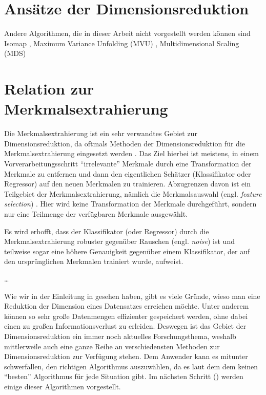 \section{Ansätze der Dimensionsreduktion}
\label{ch:Dimensionsreduktion:Ansaetze}

Andere Algorithmen, die in dieser Arbeit nicht vorgestellt werden können sind Isomap \parencite{Tenenbaum.2000}, Maximum Variance Unfolding (MVU) \parencite{Weinberger.2006}, Multidimensional Scaling (MDS) \parencites{Kruskal.1964}{Cox.2008}

\section{Relation zur Merkmalsextrahierung}
\label{ch:Dimensionsreduktion:Merkmalsextrahierung}

Die Merkmalsextrahierung ist ein sehr verwandtes Gebiet zur Dimensionsreduktion, da oftmals
Methoden der Dimensionsreduktion für die Merkmalsextrahierung eingesetzt werden \parencite[3]{Guyon.2006b}. Das Ziel hierbei ist meistens, in einem Vorverarbeitungsschritt
\enquote{irrelevante} Merkmale durch eine Transformation der Merkmale zu entfernen und dann den
eigentlichen Schätzer (Klassifikator oder Regressor) auf den neuen Merkmalen zu trainieren.
Abzugrenzen davon ist ein Teilgebiet der Merkmalsextrahierung, nämlich die Merkmalsauswahl (engl.
\textit{feature selection}) \parencite{Blum.1997}. Hier wird keine Transformation der Merkmale durchgeführt, sondern nur eine
Teilmenge der verfügbaren Merkmale ausgewählt.

Es wird erhofft, dass der Klassifikator (oder Regressor) durch die Merkmalsextrahierung robuster
gegenüber Rauschen (engl. \textit{noise}) ist und teilweise sogar eine höhere Genauigkeit gegenüber
einem Klassifikator, der auf den ursprünglichen Merkmalen trainiert wurde, aufweist.

\ldots

Wie wir in der Einleitung in  gesehen haben, gibt es viele Gründe, wieso man
eine Reduktion der Dimension eines Datensatzes erreichen möchte. Unter anderem können so sehr große
Datenmengen effizienter gespeichert werden, ohne dabei einen zu großen Informationsverlust zu
erleiden. Deswegen ist das Gebiet der Dimensionsreduktion ein immer noch aktuelles Forschungsthema,
weshalb mittlerweile auch eine ganze Reihe an verschiedensten Methoden zur Dimensionsreduktion zur
Verfügung stehen. Dem Anwender kann es mitunter schwerfallen, den richtigen Algorithmus
auszuwählen, da es laut dem dem  \parencite{Wolpert.1997} keinen \enquote{besten} Algorithmus für jede Situation gibt. Im nächsten
Schritt () werden einige dieser Algorithmen vorgestellt.